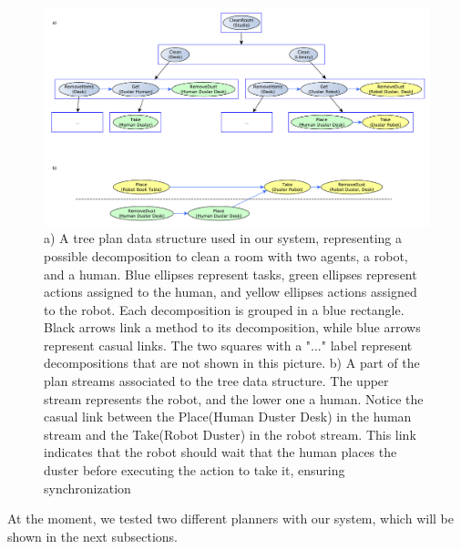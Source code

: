 \begin{figure}[ht!]
 \centering
  \includegraphics{img/plan_management/plan_data_example.pdf}
 \caption{a) A tree plan data structure used in our system, representing a possible decomposition to clean a room
 with two agents, a robot, and a human. Blue ellipses represent tasks, green ellipses represent
 actions assigned to the human, and yellow ellipses actions assigned to the robot. Each decomposition is grouped
 in a blue rectangle. Black arrows link a method to its decomposition, while blue arrows represent casual links. The two squares with a "..." label represent decompositions that are not shown in this picture.
 b) A part of the plan streams associated to the tree data structure. The upper stream represents the robot, and the lower one a human. Notice the casual link between the Place(Human Duster Desk) in the human stream and the Take(Robot Duster) in the robot stream. This link indicates that the robot should wait that the human places the duster before executing the action to take it, ensuring synchronization }
 \label{fig:plan_management-plan_structure}
 \end{figure}


At the moment, we tested two different planners with our system, which will be shown in the next subsections.

